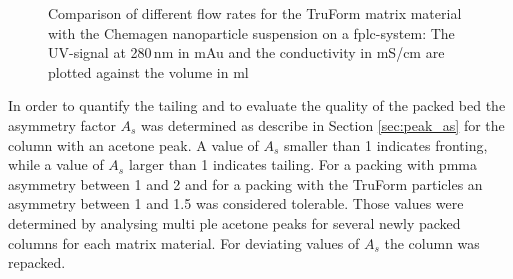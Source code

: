 \begin{figure}[H]
\centering

\caption[Comparison of different flow rates for the TruForm matrix material]{Comparison of different flow rates for the TruForm matrix material with the Chemagen nanoparticle suspension on a \gls{fplc}-system: The UV-signal at 280\,nm in mAu and the conductivity in mS/cm are plotted against the volume in ml   
\label{fig:flowrate_prax}
}
\end{figure}

In order to quantify the tailing and to evaluate the quality of the packed bed the asymmetry factor $A_{s}$ was determined as describe in Section \ref{sec:peak_as} for the column with an acetone peak. A value of $A_{s}$ smaller than 1 indicates fronting, while a value of $A_{s}$ larger than 1 indicates tailing. For a packing with \gls{pmma} asymmetry between 1 and 2 and for a packing with the TruForm particles an asymmetry between 1 and 1.5 was considered tolerable. Those values were determined by analysing multi
ple acetone peaks for several newly packed columns for each matrix material. For deviating values of $A_{s}$ the column was repacked. 

%         



